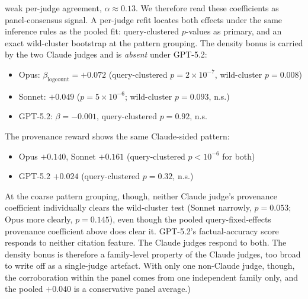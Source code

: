 \documentclass[11pt]{article}
\begin{document}
weak per-judge agreement, $\alpha\approx0.13$. We therefore read these coefficients as
panel-consensus signal. A per-judge refit locates both effects under the same inference
rules as the pooled fit: query-clustered $p$-values as primary, and an exact wild-cluster
bootstrap \citep{cameron2008wildcluster} at the pattern grouping.
The density bonus is carried by the two Claude judges and is \emph{absent} under GPT-5.2:
\begin{itemize}[nosep,leftmargin=1.4em]
\item Opus: $\beta_{\log\text{count}}=+0.072$ (query-clustered $p=2{\times}10^{-7}$, wild-cluster $p=0.008$)
\item Sonnet: $+0.049$ ($p=5{\times}10^{-6}$; wild-cluster $p=0.093$, n.s.)
\item GPT-5.2: $\beta=-0.001$, query-clustered $p=0.92$, n.s.
\end{itemize}
The provenance reward shows the same Claude-sided pattern:
\begin{itemize}[nosep,leftmargin=1.4em]
\item Opus $+0.140$, Sonnet $+0.161$ (query-clustered $p<10^{-6}$ for both)
\item GPT-5.2 $+0.024$ (query-clustered $p=0.32$, n.s.)
\end{itemize}
At the coarse pattern grouping, though, neither
Claude judge's provenance coefficient individually clears the wild-cluster test (Sonnet
narrowly, $p{=}0.053$; Opus more clearly, $p{=}0.145$), even though the pooled
query-fixed-effects provenance coefficient above does clear it.
GPT-5.2's factual-accuracy score responds to neither citation feature. The
Claude judges respond to both. The density bonus is therefore a family-level property of the
Claude judges, too broad to write off as a single-judge artefact. With only one non-Claude
judge, though, the corroboration within the panel comes from one independent family only, and
the pooled $+0.040$ is a conservative panel average.)
\end{document}

